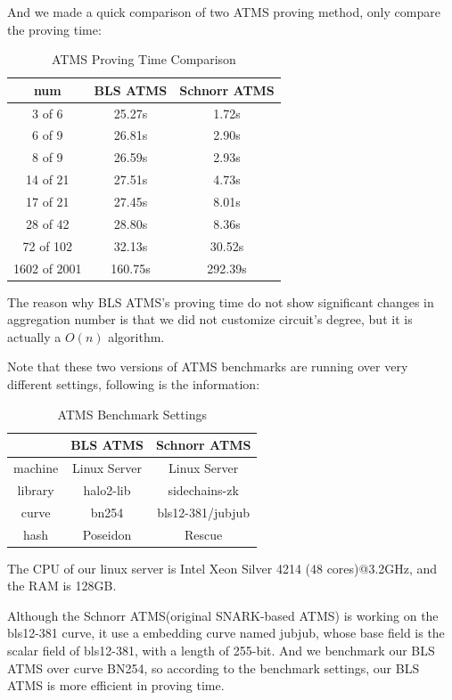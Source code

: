 \documentclass{article}
\begin{document}
And we made a quick comparison of two ATMS proving method, only compare the proving time:




\begin{table}[htbp]
\centering
\begin{tabular}{c|c|c}
\hline
\textbf{num} & \textbf{BLS ATMS} & \textbf{Schnorr ATMS}  \\ \hline
3 of 6 & 25.27s & 1.72s  \\
6 of 9 & 26.81s & 2.90s  \\
8 of 9 & 26.59s & 2.93s \\
14 of 21 & 27.51s & 4.73s  \\
17 of 21 & 27.45s & 8.01s  \\
28 of 42 & 28.80s &8.36s  \\
72 of 102 & 32.13s & 30.52s  \\
1602 of 2001 & 160.75s &  292.39s \\ \hline
\end{tabular}
\caption{ATMS Proving Time Comparison}
\end{table}


The reason why BLS ATMS's proving time do not show significant changes in aggregation number is that we did not customize circuit's degree, but it is actually a $O(n)$ algorithm. 

Note that these two versions of ATMS benchmarks are running over very different settings, following is the information:

\begin{table}[htbp]
\centering
\begin{tabular}{c|c|c}
\hline
\textbf{} & \textbf{BLS ATMS} & \textbf{Schnorr ATMS}  \\ \hline

machine & Linux Server & Linux Server \\ \hline
library & halo2-lib & sidechains-zk \\ \hline
curve & bn254& bls12-381/jubjub \\ \hline
hash& Poseidon& Rescue \\ \hline

\end{tabular}
\caption{ATMS Benchmark Settings}
\end{table}


The CPU of our linux server is Intel Xeon Silver 4214 (48 cores)@3.2GHz, and the RAM is 128GB.

Although the Schnorr ATMS(original SNARK-based ATMS) is working on the bls12-381 curve, it use a embedding curve named jubjub, whose base field is the scalar field of bls12-381, with a length of 255-bit. And we benchmark our BLS ATMS over curve BN254, so according to the benchmark settings, our BLS ATMS is more efficient in proving time.
\end{document}
